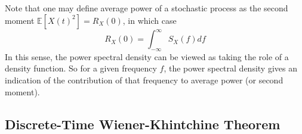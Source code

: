 \documentclass[11pt]{report} %
\begin{document}
Note that one may define average power of a stochastic process as the second moment $\mathbb{E}\left[X\left(t\right)^{2}\right] = R_{X}\left(0\right)$, in which case
\begin{equation}
R_{X}\left(0\right) = \int_{-\infty}^{\infty}S_{X}\left(f\right)df
\end{equation}
In this sense, the power spectral density can be viewed as taking the role of a density function. So for a given frequency $f$, the power spectral density gives an indication of the contribution of that frequency to average power (or second moment).

\subsection{Discrete-Time Wiener-Khintchine Theorem}
\end{document}
